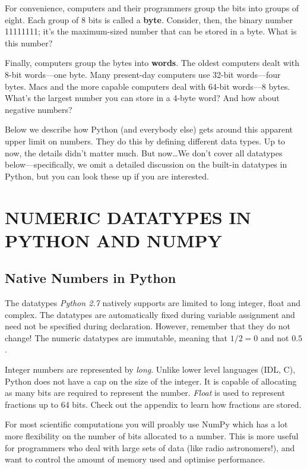 \documentclass[psfig,preprint]{aastex}
\begin{document}
	For convenience, computers and their programmers group the bits
into groups of eight. Each group of 8 bits is called a {\bf byte}.
Consider, then, the binary number 11111111; it's the maximum-sized
number that can be stored in a byte. What is this number? 

	Finally, computers group the bytes into {\bf words}.  The oldest
computers dealt with 8-bit words---one byte.  Many present-day computers use 32-bit
words---four bytes.  Macs and the more capable computers deal with 64-bit
words---8 bytes. What's the largest number you can store in a 4-byte
word? And how about negative numbers?

	Below we describe how Python (and everybody else) gets around this
apparent upper limit on numbers.  They do this by defining different
data types.  Up to now, the details didn't matter much.  But now\dots We
don't cover all datatypes below---specifically, we omit a detailed 
discussion on the built-in datatypes in Python, but you can look these 
up if you are interested.

\section{NUMERIC DATATYPES IN PYTHON AND NUMPY}
\subsection{Native Numbers in Python}
	The datatypes {\it Python 2.7} natively supports are limited to 
long integer, float and complex. The datatypes are automatically fixed during 
variable assignment and need not be specified during declaration. However, 
remember that they do not change! The numeric datatypes are immutable, 
meaning that $1/2 = 0$ and not $0.5$. 

Integer numbers are represented by {\it long}. Unlike lower level 
languages (IDL, C), Python does not have a cap on the size of the integer. It 
is capable of allocating as many bits are required to represent the number. 
{\it Float} is used to represent fractions up to 64 bits. Check out the appendix to 
learn how fractions are stored.

	For most scientific computations you will proably use NumPy 
which has a lot more flexibility on the number of bits allocated to a number. 
This is more useful for programmers who deal with large sets of data (like radio 
astronomers!), and want to control the amount of memory used and optimise performance.
\end{document}
